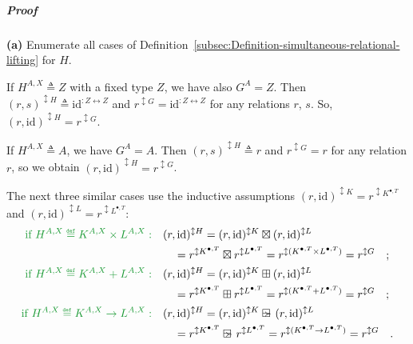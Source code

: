 \subparagraph{Proof}

\textbf{(a)} Enumerate all cases of Definition~\ref{subsec:Definition-simultaneous-relational-lifting}
for $H$.

If $H^{A,X}\triangleq Z$ with a fixed type $Z$, we have also $G^{A}=Z$.
Then $(r,s)^{\updownarrow H}\triangleq\text{id}^{:Z\leftrightarrow Z}$
and $r^{\updownarrow G}=\text{id}^{:Z\leftrightarrow Z}$ for any
relations $r$, $s$. So, $(r,\text{id})^{\updownarrow H}=r^{\updownarrow G}$.

If $H^{A,X}\triangleq A$, we have $G^{A}=A$. Then $(r,s)^{\updownarrow H}\triangleq r$
and $r^{\updownarrow G}=r$ for any relation $r$, so we obtain $(r,\text{id})^{\updownarrow H}=r^{\updownarrow G}$.

The next three similar cases use the inductive assumptions $(r,\text{id})^{\updownarrow K}=r^{\updownarrow K^{\bullet,T}}$
and $(r,\text{id})^{\updownarrow L}=r^{\updownarrow L^{\bullet,T}}$:
\begin{align*}
{\color{greenunder}\text{if }H^{A,X}\triangleq K^{A,X}\times L^{A,X}:}\quad & (r,\text{id})^{\updownarrow H}=(r,\text{id})^{\updownarrow K}\boxtimes(r,\text{id})^{\updownarrow L}\\
 & \quad=r^{\updownarrow K^{\bullet,T}}\boxtimes r^{\updownarrow L^{\bullet,T}}=r^{\updownarrow(K^{\bullet,T}\times L^{\bullet,T})}=r^{\updownarrow G}\quad;\\
{\color{greenunder}\text{if }H^{A,X}\triangleq K^{A,X}+L^{A,X}:}\quad & (r,\text{id})^{\updownarrow H}=(r,\text{id})^{\updownarrow K}\boxplus(r,\text{id})^{\updownarrow L}\\
 & \quad=r^{\updownarrow K^{\bullet,T}}\boxplus r^{\updownarrow L^{\bullet,T}}=r^{\updownarrow(K^{\bullet,T}+L^{\bullet,T})}=r^{\updownarrow G}\quad;\\
{\color{greenunder}\text{if }H^{A,X}\triangleq K^{A,X}\rightarrow L^{A,X}:}\quad & (r,\text{id})^{\updownarrow H}=(r,\text{id})^{\updownarrow K}\ogreaterthan(r,\text{id})^{\updownarrow L}\\
 & \quad=r^{\updownarrow K^{\bullet,T}}\ogreaterthan r^{\updownarrow L^{\bullet,T}}=r^{\updownarrow(K^{\bullet,T}\rightarrow L^{\bullet,T})}=r^{\updownarrow G}\quad.
\end{align*}

